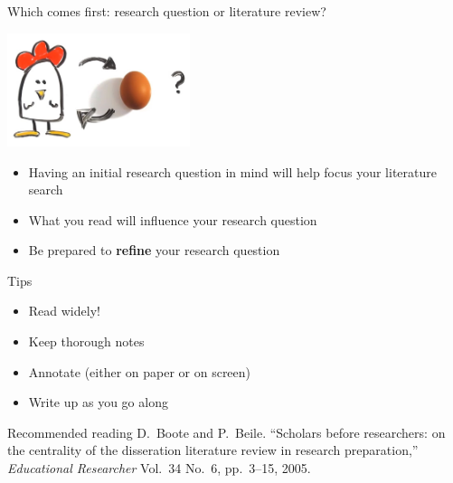\begin{frame}{Which comes first: research question or literature review?}
	\pause\begin{center}
		\includegraphics[width=0.4\textwidth]{chickenegg1}
	\end{center}
	\begin{itemize}
		\pause\item Having an initial research question in mind will help focus your literature search
		\pause\item What you read will influence your research question
		\pause\item Be prepared to \textbf{refine} your research question
	\end{itemize}
\end{frame}

\begin{frame}{Tips}
	\begin{itemize}
		\pause\item Read widely!
		\pause\item Keep thorough notes
		\pause\item Annotate (either on paper or on screen)
		\pause\item Write up as you go along
	\end{itemize}
\end{frame}

\begin{frame}{Recommended reading}
	D.\ Boote and P.\ Beile. ``Scholars before researchers: on the centrality of the disseration
		literature review in research preparation,'' \textit{Educational Researcher} Vol.\ 34 No.\ 6, pp.\ 3--15,
		2005.
\end{frame}
